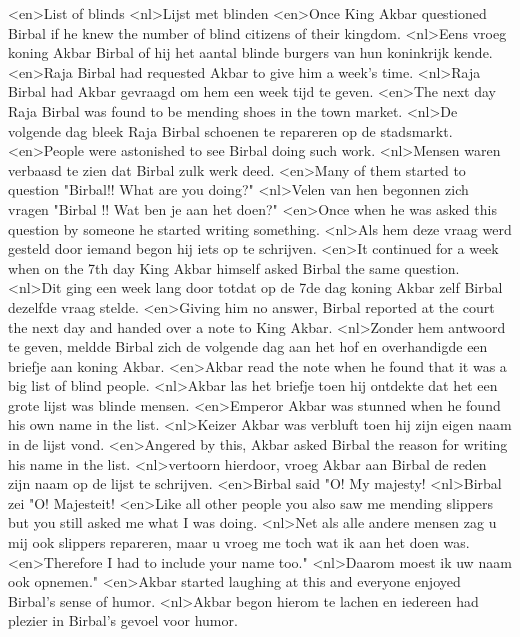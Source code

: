 <en>List of blinds
<nl>Lijst met blinden
<en>Once King Akbar questioned Birbal if he knew the number of blind citizens of their kingdom.
<nl>Eens vroeg koning Akbar Birbal of hij het aantal blinde burgers van hun koninkrijk kende.
<en>Raja Birbal had requested Akbar to give him a week’s time.
<nl>Raja Birbal had Akbar gevraagd om hem een week tijd te geven.
<en>The next day Raja Birbal was found to be mending shoes in the town market.
<nl>De volgende dag bleek Raja Birbal schoenen te repareren op de stadsmarkt.
<en>People were astonished to see Birbal doing such work.
<nl>Mensen waren verbaasd te zien dat Birbal zulk werk deed.
<en>Many of them started to question "Birbal!! What are you doing?"
<nl>Velen van hen begonnen zich  vragen "Birbal !! Wat ben je aan het doen?"
<en>Once when he was asked this question by someone he started writing something.
<nl>Als hem deze vraag werd gesteld door iemand begon hij iets op te schrijven.
<en>It continued for a week when on the 7th day King Akbar himself asked Birbal the same question.
<nl>Dit ging een week lang door totdat op de 7de dag koning Akbar zelf  Birbal dezelfde vraag stelde.
<en>Giving him no answer, Birbal reported at the court the next day and handed over a note to King Akbar.
<nl>Zonder hem antwoord te geven, meldde Birbal zich de  volgende dag aan het hof en overhandigde een briefje aan koning Akbar.
<en>Akbar read the note when he found that it was a big list of blind people.
<nl>Akbar las het briefje toen hij ontdekte dat het een grote lijst was blinde  mensen.
<en>Emperor Akbar was stunned when he found his own name in the list.
<nl>Keizer Akbar was verbluft toen hij zijn eigen naam in de lijst vond.
<en>Angered by this, Akbar asked Birbal the reason for writing his name in the list.
<nl>vertoorn hierdoor, vroeg Akbar aan Birbal de reden zijn naam op de lijst te schrijven.
<en>Birbal said "O! My majesty!
<nl>Birbal zei "O!  Majesteit!
<en>Like all other people you also saw me mending slippers but you still asked me what I was doing.
<nl>Net als alle andere mensen zag u mij ook slippers repareren, maar u vroeg me toch wat ik aan het doen was.
<en>Therefore I had to include your name too."
<nl>Daarom moest ik uw naam ook opnemen."
<en>Akbar started laughing at this and everyone enjoyed Birbal's sense of humor.
<nl>Akbar begon hierom te lachen en iedereen had plezier in Birbal's gevoel voor humor.

